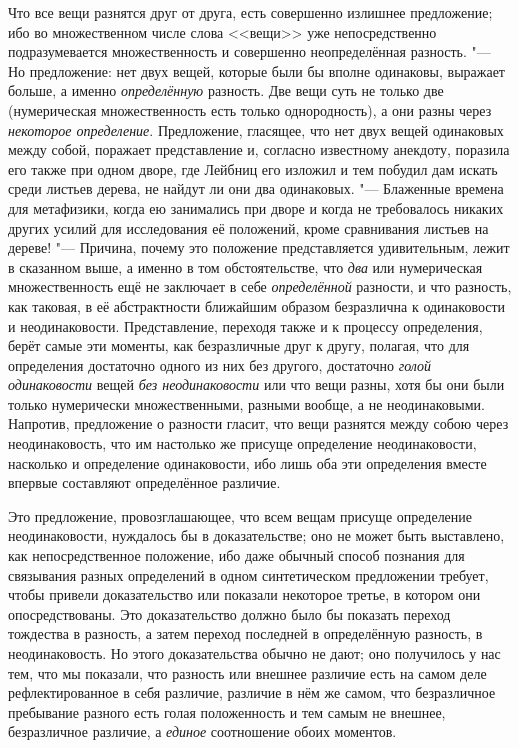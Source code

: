 Что все вещи разнятся друг от друга, есть совершенно излишнее предложение;
ибо во множественном числе слова <<вещи>> уже непосредственно подразумевается
множественность и совершенно неопределённая разность. "--- Но предложение: нет
двух вещей, которые были бы вполне одинаковы, выражает больше, а именно
{\em определённую} разность. Две вещи суть не только
две (нумерическая множественность есть только однородность), а они разны
через {\em некоторое определение}. Предложение,
гласящее, что нет двух вещей одинаковых между собой, поражает представление
и, согласно известному анекдоту, поразила его также при одном дворе, где
Лейбниц его изложил и тем побудил дам искать среди листьев дерева, не
найдут ли они два одинаковых. "--- Блаженные времена для метафизики, когда ею
занимались при дворе и когда не требовалось никаких других усилий для
исследования её положений, кроме сравнивания листьев на дереве! "--- Причина,
почему это положение представляется удивительным, лежит в сказанном выше, а
именно в том обстоятельстве, что {\em два} или
нумерическая множественность ещё не заключает в себе
{\em определённой} разности, и что разность, как
таковая, в её абстрактности ближайшим образом безразлична к одинаковости и
неодинаковости. Представление, переходя также и к процессу определения,
берёт самые эти моменты, как безразличные друг к другу, полагая, что для
определения достаточно одного из них без другого, достаточно
{\em голой одинаковости} вещей
{\em без неодинаковости} или что вещи разны, хотя бы
они были только нумерически множественными, разными вообще, а не
неодинаковыми. Напротив, предложение о разности гласит, что вещи разнятся
между собою через неодинаковость, что им настолько же присуще определение
неодинаковости, насколько и определение одинаковости, ибо лишь оба эти
определения вместе впервые составляют определённое различие.

Это предложение, провозглашающее, что всем вещам присуще определение
неодинаковости, нуждалось бы в доказательстве; оно не может быть
выставлено, как непосредственное положение, ибо даже обычный способ
познания для связывания разных определений в одном синтетическом
предложении требует, чтобы привели доказательство или показали некоторое
третье, в котором они опосредствованы. Это доказательство должно было бы
показать переход тождества в разность, а затем переход последней в
определённую разность, в неодинаковость. Но этого доказательства обычно не
дают; оно получилось у нас тем, что мы показали, что разность или внешнее
различие есть на самом деле рефлектированное в себя различие, различие в
нём же самом, что безразличное пребывание разного есть голая положенность и
тем самым не внешнее, безразличное различие, а
{\em единое} соотношение обоих моментов.

